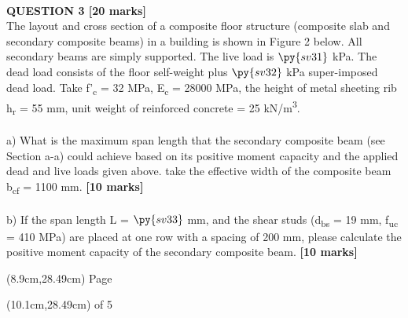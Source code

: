\documentclass[a4paper,11pt]{article}
\begin{document}
\\
\noindent
\textbf{QUESTION 3 [20 marks]}\\
The layout and cross section of a composite floor structure (composite slab and secondary composite beams) in a building is shown in Figure 2 below. All secondary beams are simply supported. The live load is $\py{sv31}$ kPa. The dead load consists of the floor self-weight plus $\py{sv32}$ kPa super-imposed dead load. Take f'\textsubscript{c} = 32 MPa, E\textsubscript{c} = 28000 MPa, the height of metal sheeting rib h\textsubscript{r} = 55 mm, unit weight of reinforced concrete = 25 kN/m\textsuperscript{3}.
\\
\\
a) What is the maximum span length that the secondary composite beam (see Section a-a) could achieve based on its positive moment capacity and the applied dead and live loads given above. take the effective width of the composite beam b\textsubscript{cf} = 1100 mm. \textbf{[10 marks]}\\
\\
b) If the span length L = $\py{sv33}$  mm, and the shear studs (d\textsubscript{bs} = 19 mm, f\textsubscript{uc} = 410 MPa) are placed at one row with a spacing of 200 mm, please calculate the positive moment capacity of the secondary composite beam. \textbf{[10 marks]}\\
\begin{textblock*}{5cm}(8.9cm,28.49cm)
Page
\end{textblock*}
\begin{textblock*}{5cm}(10.1cm,28.49cm)
of 5
\end{textblock*}
\newpage
\noindent
\end{document}
